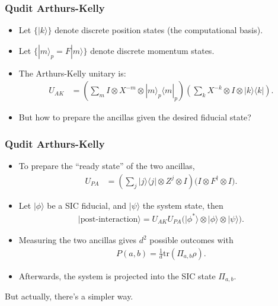 \documentclass{beamer}
\newcommand{\tr}{{\text{tr}}}
\begin{document}
\begin{frame}
\frametitle{Qudit Arthurs-Kelly}
\begin{itemize}
	\item Let $\{|k \rangle\}$ denote discrete position states (the computational basis).
\item Let  $\{|m\rangle_p=F|m\rangle\}$ denote discrete momentum states.
\item The Arthurs-Kelly unitary is:
\begin{align}
U_{AK} &= \left(\sum_m I \otimes X^{-m} \otimes |m\rangle_p\langle m|_p	\right)\left(\sum_k X^{-k} \otimes I \otimes |k\rangle\langle k|\right).
\end{align}
\item But how to  prepare the ancillas given the desired fiducial state?
\end{itemize}

\end{frame}

\begin{frame}
\frametitle{Qudit Arthurs-Kelly}
\begin{itemize}
 \item To prepare the ``ready state'' of the two ancillas,
\begin{align}
U_{PA} &= 	\left(\sum_j |j\rangle\langle j|\otimes Z^j	\otimes I\right)\Big(I \otimes F^\dagger \otimes I\Big).
\end{align}
\item Let $|\phi\rangle$ be a SIC fiducial, and $|\psi\rangle$  the system state, then
\begin{align}
|\text{post-interaction}\rangle=U_{AK}U_{PA}\Big(|\phi^*\rangle	\otimes |\phi\rangle \otimes |\psi\rangle\Big).
\end{align}
\item 	Measuring the two ancillas gives $d^2$ possible outcomes with \begin{align}
 	P(a,b)=\frac{1}{d}\tr(\Pi_{a,b}\rho).
 \end{align}
\item Afterwards, the system is projected into the SIC state $\Pi_{a,b}$.
\end{itemize}
\end{frame}

\begin{frame}
	\begin{center}
	But actually, there's a simpler way.	
	\end{center}

\end{frame}
\end{document}
